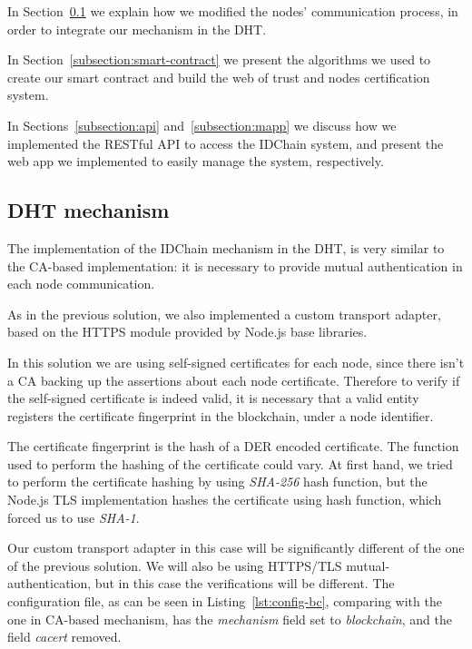 In Section~\ref{subsection:dht-mechanism} we explain how we modified the nodes' communication process, in order to integrate our mechanism in the DHT.

In Section~\ref{subsection:smart-contract} we present the algorithms we used to create our smart contract and build the web of trust and nodes certification system.

In Sections~\ref{subsection:api} and~\ref{subsection:mapp} we discuss how we implemented the RESTful API to access the IDChain system, and present the web app we implemented to easily manage the system, respectively.

\subsection{DHT mechanism}\label{subsection:dht-mechanism}

The implementation of the IDChain mechanism in the DHT, is very similar to the CA-based implementation: it is necessary to provide mutual authentication in each node communication.

As in the previous solution, we also implemented a custom transport adapter, based on the HTTPS module provided by Node.js base libraries.

In this solution we are using self-signed certificates for each node, since there isn't a CA backing up the assertions about each node certificate.
Therefore to verify if the self-signed certificate is indeed valid, it is necessary that a valid entity registers the certificate fingerprint in the blockchain, under a node identifier.

The certificate fingerprint is the hash of a \ac{DER} encoded certificate. The function used to perform the hashing of the certificate could vary.
At first hand, we tried to perform the certificate hashing by using \textit{SHA-256} hash function, but the Node.js TLS implementation hashes the certificate using  hash function, which forced us to use \textit{SHA-1}.

Our custom transport adapter in this case will be significantly different of the one of the previous solution.
We will also be using HTTPS/TLS mutual-authentication, but in this case the verifications will be different.
The configuration file, as can be seen in Listing~\ref{lst:config-bc}, comparing with the one in CA-based mechanism, has the \textit{mechanism} field set to \textit{blockchain}, and the field \textit{cacert} removed.



